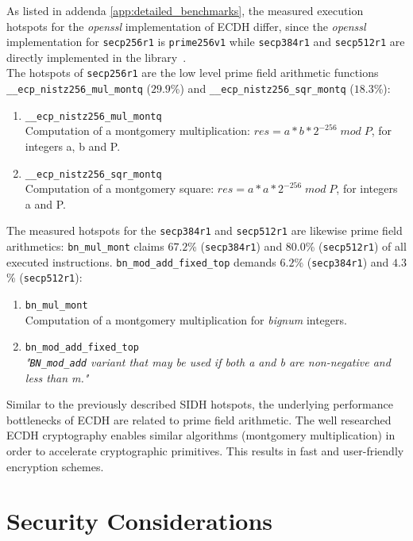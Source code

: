 As listed in addenda \ref{app:detailed_benchmarks}, the measured execution hotspots for the \textit{openssl} implementation of ECDH differ, since the \textit{openssl} implementation for \texttt{secp256r1} is \texttt{prime256v1} while \texttt{secp384r1} and \texttt{secp512r1} are directly implemented in the library~\parencite{turner2009elliptic}.\\
The hotspots of \texttt{secp256r1} are the low level prime field arithmetic functions \texttt{\_\_ecp\_nistz256\_mul\_montq} ($29.9$\%) and \texttt{\_\_ecp\_nistz256\_sqr\_montq} ($18.3$\%):
\begin{enumerate}
\item \texttt{\_\_ecp\_nistz256\_mul\_montq}\\Computation of a montgomery multiplication: $res = a*b*2^{-256}\;mod\;P$, for integers a, b and P.
\item \texttt{\_\_ecp\_nistz256\_sqr\_montq} \\Computation of a montgomery square: $res = a*a*2^{-256}\;mod\;P$, for integers a and P.
\end{enumerate}
The measured hotspots for the \texttt{secp384r1} and \texttt{secp512r1} are likewise prime field arithmetics: \texttt{bn\_mul\_mont} claims $67.2$\% (\texttt{secp384r1}) and $80.0$\% (\texttt{secp512r1}) of all executed instructions. \texttt{bn\_mod\_add\_fixed\_top} demands $6.2$\% (\texttt{secp384r1}) and $4.3$\% (\texttt{secp512r1}):
\begin{enumerate}
\item \texttt{bn\_mul\_mont}\\Computation of a montgomery multiplication for \textit{bignum} integers.
\item \texttt{bn\_mod\_add\_fixed\_top}\\\textit{"\texttt{BN\_mod\_add} variant that may be used if both a and b are non-negative and less than m."}
\end{enumerate}
Similar to the previously described SIDH hotspots, the underlying performance bottlenecks of ECDH are related to prime field arithmetic. The well researched ECDH cryptography enables similar  algorithms (montgomery multiplication) in order to accelerate cryptographic primitives. This results in fast and user-friendly encryption schemes.
\section{Security Considerations}\label{sec:analysis_security}

